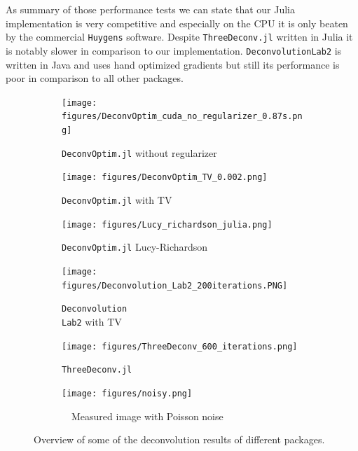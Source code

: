 \documentclass{juliacon}
\begin{document}
        As summary of those performance tests we can state that our Julia implementation is very competitive and especially on the CPU it is only
        beaten by the commercial \verb|Huygens| software. Despite \verb|ThreeDeconv.jl| written in Julia 
        it is notably slower in comparison to our implementation.
        \verb|DeconvolutionLab2| is written in Java and uses hand optimized gradients but still its performance is poor in comparison to all
        other packages.


        \begin{figure}[h]
            \begin{subfigure}{.3\textwidth}
                \centering
                \texttt{[image: figures/DeconvOptim\_cuda\_no\_regularizer\_0.87s.png]}
                \caption{\texttt{DeconvOptim.jl} without regularizer}
            \end{subfigure}
            \begin{subfigure}{.3\textwidth}
                \centering
                \texttt{[image: figures/DeconvOptim\_TV\_0.002.png]}
                \caption{\texttt{DeconvOptim.jl} with TV}
            \end{subfigure}
            \begin{subfigure}{.3\textwidth}
                \centering
                \texttt{[image: figures/Lucy\_richardson\_julia.png]}
                \caption{\texttt{DeconvOptim.jl} Lucy-Richardson}
            \end{subfigure}
            \bigskip
            \begin{subfigure}{.3\textwidth}
                \centering
                \texttt{[image: figures/Deconvolution\_Lab2\_200iterations.PNG]}
                \caption{\texttt{Deconvolution\\Lab2} with TV}
            \end{subfigure}
            \begin{subfigure}{.3\textwidth}
                \centering
                \texttt{[image: figures/ThreeDeconv\_600\_iterations.png]}
                \caption{\texttt{ThreeDeconv.jl}}
            \end{subfigure}
            \begin{subfigure}{.3\textwidth}
                \centering
                \texttt{[image: figures/noisy.png]}
                \caption{~~Measured image with Poisson noise}
            \end{subfigure}
            \caption{Overview of some of the deconvolution results of different packages.}
            \label{img:results}
        \end{figure} 
\end{document}
